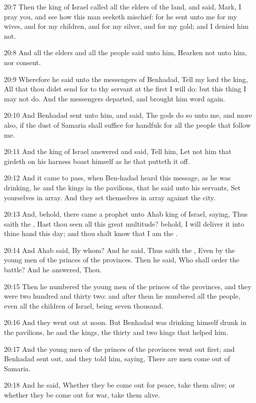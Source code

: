 20:7 Then the king of Israel called all the elders of the land, and said, Mark, I pray you, and see how this man seeketh mischief: for he sent unto me for my wives, and for my children, and for my silver, and for my gold; and I denied him not.

20:8 And all the elders and all the people said unto him, Hearken not unto him, nor consent.

20:9 Wherefore he said unto the messengers of Benhadad, Tell my lord the king, All that thou didst send for to thy servant at the first I will do: but this thing I may not do. And the messengers departed, and brought him word again.

20:10 And Benhadad sent unto him, and said, The gods do so unto me, and more also, if the dust of Samaria shall suffice for handfuls for all the people that follow me.

20:11 And the king of Israel answered and said, Tell him, Let not him that girdeth on his harness boast himself as he that putteth it off.

20:12 And it came to pass, when Ben-hadad heard this message, as he was drinking, he and the kings in the pavilions, that he said unto his servants, Set yourselves in array. And they set themselves in array against the city.

20:13 And, behold, there came a prophet unto Ahab king of Israel, saying, Thus saith the \LORD, Hast thou seen all this great multitude?  behold, I will deliver it into thine hand this day; and thou shalt know that I am the \LORD.

20:14 And Ahab said, By whom? And he said, Thus saith the \LORD, Even by the young men of the princes of the provinces. Then he said, Who shall order the battle? And he answered, Thou.

20:15 Then he numbered the young men of the princes of the provinces, and they were two hundred and thirty two: and after them he numbered all the people, even all the children of Israel, being seven thousand.

20:16 And they went out at noon. But Benhadad was drinking himself drunk in the pavilions, he and the kings, the thirty and two kings that helped him.

20:17 And the young men of the princes of the provinces went out first; and Benhadad sent out, and they told him, saying, There are men come out of Samaria.

20:18 And he said, Whether they be come out for peace, take them alive; or whether they be come out for war, take them alive.

